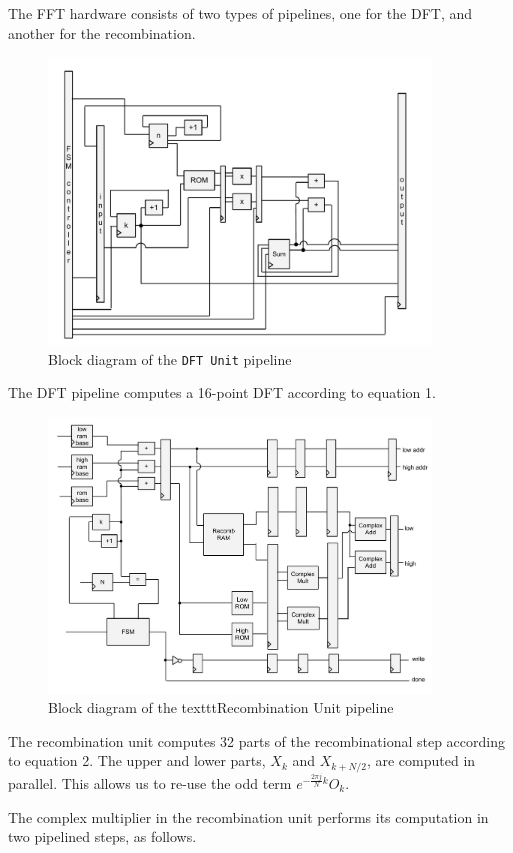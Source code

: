 \documentclass{article}
\begin{document}
The FFT hardware consists of two types of pipelines, one for the DFT,
and another for the recombination. 

\begin{figure}[H]
	\centering
	\includegraphics[width=4in]{dft-unit}
	\caption{Block diagram of the \texttt{DFT Unit} pipeline}
\end{figure}

The DFT pipeline computes a 16-point DFT according to equation 1. 

\begin{figure}[H]
	\centering
	\includegraphics[width=4in]{recombinator}
	\caption{Block diagram of the texttt{Recombination Unit} pipeline}
\end{figure}

The recombination unit computes 32 parts of the recombinational step 
according to equation 2. The upper and lower parts, \(X_k\) and 
\(X_{k + N / 2}\), are computed in parallel. This allows us to re-use the 
odd term \(e^{-\frac{2\pi j}{N}k} O_k\).

The complex multiplier in the recombination unit performs its computation
in two pipelined steps, as follows.
\end{document}
